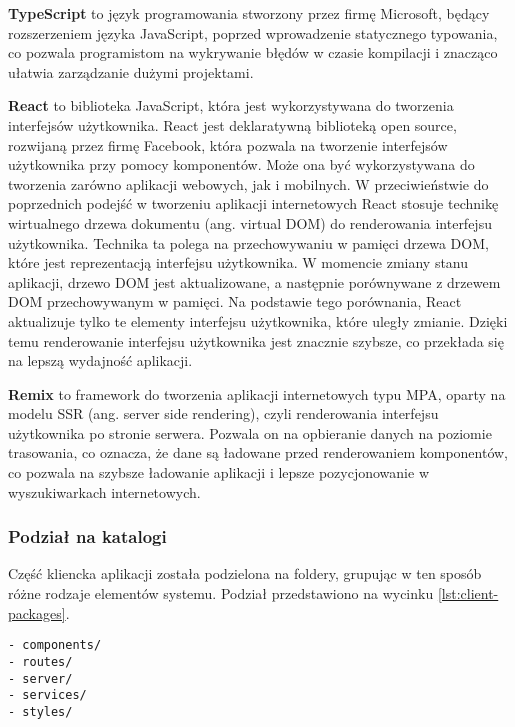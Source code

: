 \textbf{TypeScript} \cite{typescript} to język programowania stworzony przez firmę Microsoft, będący rozszerzeniem języka JavaScript, poprzed wprowadzenie statycznego typowania, co pozwala programistom na wykrywanie błędów w czasie kompilacji i znacząco ułatwia zarządzanie dużymi projektami. 

\textbf{React} \cite{react} to biblioteka JavaScript, która jest wykorzystywana do tworzenia interfejsów użytkownika. React jest deklaratywną biblioteką open source, rozwijaną przez firmę Facebook, która pozwala na tworzenie interfejsów użytkownika przy pomocy komponentów. Może ona być wykorzystywana do tworzenia zarówno aplikacji webowych, jak i mobilnych. W przeciwieństwie do poprzednich podejść w tworzeniu aplikacji internetowych React stosuje technikę wirtualnego drzewa dokumentu (ang. virtual DOM) do renderowania interfejsu użytkownika. Technika ta polega na przechowywaniu w pamięci drzewa DOM, które jest reprezentacją interfejsu użytkownika. W momencie zmiany stanu aplikacji, drzewo DOM jest aktualizowane, a następnie porównywane z drzewem DOM przechowywanym w pamięci. Na podstawie tego porównania, React aktualizuje tylko te elementy interfejsu użytkownika, które uległy zmianie. Dzięki temu renderowanie interfejsu użytkownika jest znacznie szybsze, co przekłada się na lepszą wydajność aplikacji.

\textbf{Remix} \cite{remix} to framework do tworzenia aplikacji internetowych typu MPA, oparty na modelu SSR (ang. server side rendering), czyli renderowania interfejsu użytkownika po stronie serwera. Pozwala on na opbieranie danych na poziomie trasowania, co oznacza, że dane są ładowane przed renderowaniem komponentów, co pozwala na szybsze ładowanie aplikacji i lepsze pozycjonowanie w wyszukiwarkach internetowych.

\subsubsection{Podział na katalogi}

Część kliencka aplikacji została podzielona na foldery, grupując w ten sposób różne rodzaje elementów systemu. Podział przedstawiono na wycinku \ref{lst:client-packages}.

\begin{lstlisting}[caption={Podział na foldery części klienckiej projektu},label={lst:client-packages},captionpos=b]
- components/
- routes/
- server/
- services/
- styles/
\end{lstlisting}

